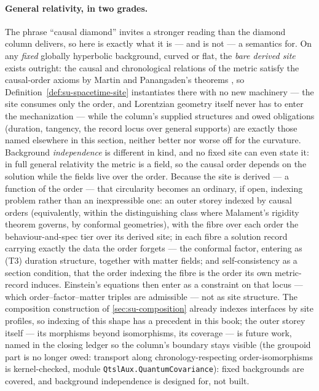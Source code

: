 \paragraph{General relativity, in two grades.} The phrase ``causal
diamond'' invites a stronger reading than the diamond column
delivers, so here is exactly what it is --- and is not --- a
semantics for. On any \emph{fixed} globally hyperbolic
background, curved or flat, the \emph{bare derived site} exists
outright: the causal
and chronological relations of the metric satisfy the causal-order
axioms by Martin and Panangaden's theorems \cite{martin04}, so
Definition~\ref{def:su-spacetime-site} instantiates there with no
new machinery --- the site consumes only the order, and Lorentzian
geometry itself never has to enter the mechanization --- while the
column's supplied structures and owed obligations (duration,
tangency, the record locus over general supports) are exactly those
named elsewhere in this section, neither better nor worse off for
the curvature. Background
\emph{independence} is different in kind, and no fixed site can even
state it: in full general relativity the metric is a field, so the
causal order depends on the solution while the fields live over the
order. Because the site is derived --- a function of the order ---
that circularity becomes an ordinary, if open, indexing problem
rather than an inexpressible one: an outer storey indexed by causal
orders (equivalently, within the distinguishing class where
Malament's rigidity theorem
\cite{malament77} governs, by conformal geometries), with the fibre over
each order the behaviour-and-spec tier over its derived site; in
each fibre a solution record carrying exactly the data the order
forgets --- the conformal factor, entering as (T3) duration
structure, together with matter fields; and self-consistency as a
section condition, that the order indexing the fibre is the order
its own metric-record induces. Einstein's equations then enter as a
constraint on that locus --- which order--factor--matter triples are
admissible --- not as site structure. The composition construction of
\autoref{sec:su-composition} already indexes interfaces by site
profiles, so indexing of this shape has a precedent in this book;
the outer storey itself --- its morphisms beyond isomorphisms, its
coverage --- is future work, named in the closing ledger so the
column's boundary stays visible (the groupoid part is no
longer owed: transport along chronology-respecting
order-isomorphisms is kernel-checked, module
\texttt{QtslAux.QuantumCovariance}): fixed
backgrounds are covered, and background independence is designed
for, not built.

